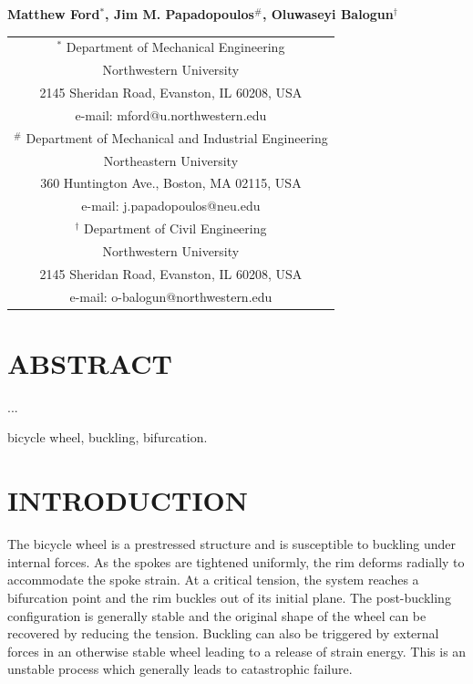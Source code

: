 \documentclass{bmd2016p}
\begin{document}
\begin{center}
\end{center}

\begin{center}
\normalsize{\bf{Matthew Ford$^{*}$, Jim M. Papadopoulos$^\#$, 
            Oluwaseyi Balogun$^\dag$}}
\end{center} 

\begin{center}
\begin{tabular}{c}
$^*$ Department of Mechanical Engineering\\
Northwestern University\\
2145 Sheridan Road, Evanston, IL 60208, USA\\
e-mail: mford@u.northwestern.edu\\[2.5ex]

$^\#$ Department of Mechanical and Industrial Engineering\\
Northeastern University\\
360 Huntington Ave., Boston, MA 02115, USA\\
e-mail: j.papadopoulos@neu.edu\\[2.5ex]

$^\dag$ Department of Civil Engineering\\
Northwestern University\\
2145 Sheridan Road, Evanston, IL 60208, USA\\
e-mail: o-balogun@northwestern.edu\\
\end{tabular}
\end{center}

\section*{ABSTRACT}

...

\begin{keywords}
bicycle wheel, 
buckling, 
bifurcation.
\end{keywords}





\section{INTRODUCTION}

The bicycle wheel is a prestressed structure and is susceptible to buckling under internal forces. As the spokes are tightened uniformly, the rim deforms radially to accommodate the spoke strain. At a critical tension, the system reaches a bifurcation point and the rim buckles out of its initial plane. The post-buckling configuration is generally stable and the original shape of the wheel can be recovered by reducing the tension. Buckling can also be triggered by external forces in an otherwise stable wheel leading to a release of strain energy. This is an unstable process which generally leads to catastrophic failure.
\end{document}
